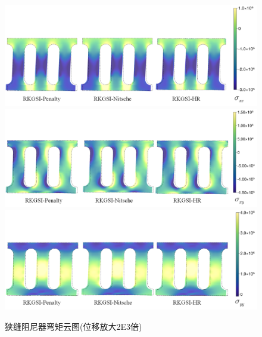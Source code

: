 \begin{figure}[H]
    \centering
        \includegraphics[scale=0.5]{figure/DAMPER/slit/M11.png}
        \includegraphics[scale=0.5]{figure/DAMPER/slit/M12.png}
        \includegraphics[scale=0.5]{figure/DAMPER/slit/M22.png}
    \caption{狭缝阻尼器弯矩云图(位移放大2E3倍)}\label{slitM}
\end{figure}
